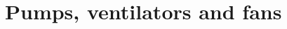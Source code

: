 \documentclass[12pt]{report}
\begin{document}
\chapter{Pumps, ventilators and fans}
\label{chap:pumps}










\end{document}
